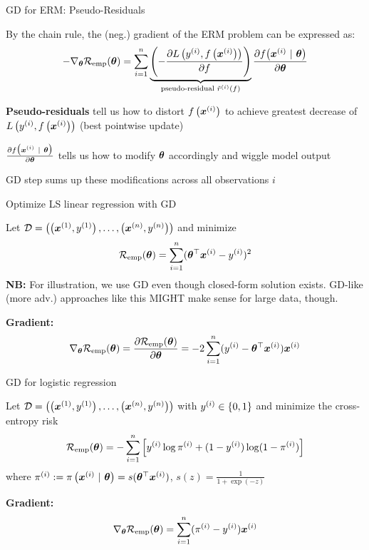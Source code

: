 \documentclass[11pt,compress,t,notes=noshow, xcolor=table]{beamer}
\begin{document}
\begin{framei}[fs=footnotesize]{GD for ERM: Pseudo-Residuals}
\item By the chain rule, the (neg.) gradient of the ERM problem can be expressed as:
$$
- \nabla_{\thetav} \risket = \sumin \underbrace{\left( - \pd{\Lxyi}{f} \right)}_{\text{pseudo-residual } \tilde r^{(i)}(f)} \pd{\fxit}{\thetav}
$$
\item \textbf{Pseudo-residuals} tell us how to distort $\fxi$ to achieve greatest decrease of $\Lxyi$ (best pointwise update)
\item $\pd{\fxit}{\thetav}$ tells us how to modify $\thetav$ accordingly and wiggle model output
\item GD step sums up these modifications across all observations $i$
{}
\end{framei}


\begin{framei}{Optimize LS linear regression with GD}
\item Let $\D = \Dset$ and minimize
$$\risket = \sumin (\thetav^\top \xi - \yi)^2$$
{\footnotesize
\textbf{NB:} For illustration, we use GD even though closed-form solution exists. GD-like (more adv.) approaches like this MIGHT make sense for large data, though.}
\item\textbf{Gradient: } $$\nabla_{\thetav}\risket = \frac{\partial \risket}{\partial \thetav} = -2 \sumin (\yi - \thetav^{\top} \xi) \xi$$
\end{framei}


\begin{framei}{GD for logistic regression}
\item Let $\D = \Dset$ with $\yi \in \{0, 1\}$ and minimize the cross-entropy risk
$$\risket = - \sumin \left[\yi \log \pi^{(i)} + (1 - \yi) \log(1 - \pi^{(i)})\right]$$
where $\pi^{(i)} := \pixit = s(\thetav^\top \xi)$, \quad $s(z) = \tfrac{1}{1 + \exp(-z)}$
\item \textbf{Gradient:}
$$\nabla_{\thetav} \risket = \sumin (\pi^{(i)} - \yi) \xi$$
\end{framei}
\end{document}
